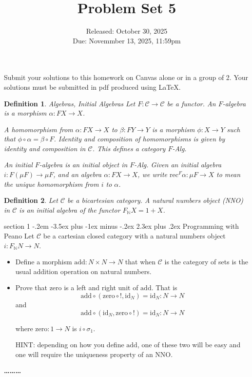 \documentclass[12pt]{article}
\makeatletter
\newtheorem{definition}{Definition}
\newenvironment{problem}{\@startsection
       {section}
       {1}
       {-.2em}
       {-3.5ex plus -1ex minus -.2ex}
       {2.3ex plus .2ex}
       {\pagebreak[3]%
       \large\bf\noindent{Problem }
       }
       }
       {%
       \begin{center}\large\bf \ldots\ldots\ldots\end{center}}
\newcommand{\zero}{\textrm{zero}}
\newcommand{\id}{\mathrm{id}}
\newcommand{\cat}{\mathcal}
\makeatother
\begin{document}
\title{Problem Set 5}
\date{Released: October 30, 2025\\
  Due: Novemmber 13, 2025, 11:59pm
}
\maketitle

Submit your solutions to this homework on Canvas alone or in a group of 2.
Your solutions must be submitted in pdf produced using LaTeX.

\begin{definition}{Algebras, Initial Algebras}
  Let $F : \cat C \to \cat C$ be a functor.
  An $F$-algebra is a morphism $\alpha : F X \to X$.

  A homomorphism from $\alpha : F X \to X$ to $\beta : F Y \to Y$ is a
  morphism $\phi : X \to Y$ such that $\phi \circ \alpha = \beta \circ
  F$. Identity and composition of homomorphisms is given by identity
  and composition in $\cat C$. This defines a category $F$-Alg.

  An initial $F$-algebra is an initial object in $F$-Alg. Given an
  initial algebra $i : F(\mu F) \to \mu F$, and an algebra $\alpha : F
  X \to X$, we write $\textrm{rec}^F\alpha : \mu F \to X$ to mean the
  unique homomorphism from $i$ to $\alpha$.
\end{definition}

\begin{definition}
  Let $\cat C$ be a bicartesian category. A natural numbers object
  (NNO) in $\cat C$ is an initial algebra of the functor $F_{\mathbb
    N} X = 1 + X$.
\end{definition}


\begin{problem}{Programming with Peano}
  Let $\cat C$ be a cartesian closed category with a natural numbers
  object $i : F_{\mathbb N} N \to N$.

  \begin{itemize}
  \item Define a morphism $\textrm{add} : N \times N \to N$ that when
    $\cat C$ is the category of sets is the usual addition operation on
    natural numbers.
  \item Prove that zero is a left and right unit of $\textrm{add}$. That is
    \[ \textrm{add} \circ (\zero{}\circ {!}, \id_N) = \id_N : N \to N \]
    and
    \[ \textrm{add} \circ (\id_N, \zero{}\circ {!}) = \id_N : N \to N \]

    where $\zero{} : 1 \to N$ is $i \circ \sigma_1$.

    HINT: depending on how you define $\textrm{add}$, one of these two
    will be easy and one will require the uniqueness property of an NNO.
  \end{itemize}
\end{problem}
\end{document}
